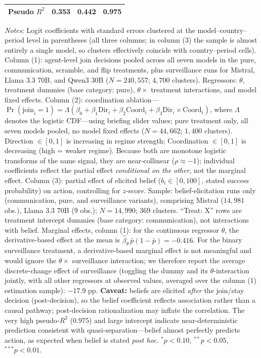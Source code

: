 \begin{table}[htbp]
\begin{tabular}{lcccccc}
Pseudo $R^2$ & \multicolumn{2}{c}{0.353} & \multicolumn{2}{c}{0.442} & \multicolumn{2}{c}{0.975} \\
\bottomrule
\end{tabular}
\begin{tablenotes}
\scriptsize
\textit{Notes:} Logit coefficients with standard errors clustered at the model--country--period level in parentheses (all three columns; in column (3) the sample is almost entirely a single model, so clusters effectively coincide with country--period cells).
Column (1): agent-level join decisions pooled across all seven models in the pure, communication, scramble, and flip treatments, plus surveillance runs for Mistral, Llama 3.3 70B, and Qwen3 30B ($N = 240{,}557$; $4{,}700$ clusters). Regressors: $\theta$, treatment dummies (base category: pure), $\theta \times$ treatment interactions, and model fixed effects.
Column (2): coordination ablation---$\Pr(\text{join}_i = 1) = \Lambda(\beta_0 + \beta_1 \text{Dir}_i + \beta_2 \text{Coord}_i + \beta_3 \text{Dir}_i \times \text{Coord}_i)$, where $\Lambda$ denotes the logistic CDF---using briefing slider values; pure treatment only, all seven models pooled, no model fixed effects ($N = 44{,}662$; $1{,}400$ clusters). Direction $\in [0,1]$ is increasing in regime strength; Coordination $\in [0,1]$ is decreasing (high = weaker regime). Because both are monotone logistic transforms of the same signal, they are near-collinear ($\rho \approx -1$); individual coefficients reflect the partial effect \textit{conditional on the other}, not the marginal effect.
Column (3): partial effect of elicited belief ($b_i \in [0,100]$, stated success probability) on action, controlling for $z$-score. Sample: belief-elicitation runs only (communication, pure, and surveillance variants), comprising Mistral ($14{,}981$ obs.), Llama 3.3 70B ($9$ obs.); $N = 14{,}990$; $369$ clusters. ``Treat: X'' rows are treatment intercept dummies (base category: communication), not interactions with belief.
Marginal effects, column (1): for the continuous regressor $\theta$, the derivative-based effect at the mean is $\hat{\beta}_\theta \, \bar{p}(1-\bar{p}) = -0.416$.
For the binary surveillance treatment, a derivative-based marginal effect is not meaningful and would ignore the $\theta \times$ surveillance interaction; we therefore report the average discrete-change effect of surveillance (toggling the dummy and its $\theta$-interaction jointly, with all other regressors at observed values, averaged over the column (1) estimation sample): $-17.9$ pp.
\textbf{Caveat:} beliefs are elicited \textit{after} the join/stay decision (post-decision), so the belief coefficient reflects association rather than a causal pathway; post-decision rationalization may inflate the correlation.
The very high pseudo-$R^2$ (0.975) and large intercept indicate near-deterministic prediction consistent with quasi-separation---belief almost perfectly predicts action, as expected when belief is stated \textit{post hoc}.
${}^{*}p<0.10$, ${}^{**}p<0.05$, ${}^{***}p<0.01$.
\end{tablenotes}
\end{table}
